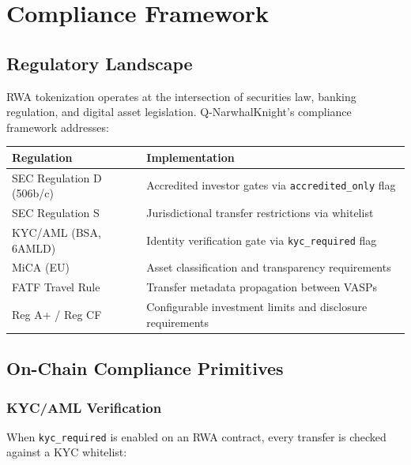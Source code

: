 \documentclass[11pt,a4paper,twoside]{article}
\begin{document}
\section{Compliance Framework}
\label{sec:compliance}

\subsection{Regulatory Landscape}

RWA tokenization operates at the intersection of securities law, banking regulation, and digital asset legislation. Q-NarwhalKnight's compliance framework addresses:

\begin{compliancebox}
\begin{tabularx}{\textwidth}{lX}
\textbf{Regulation} & \textbf{Implementation} \\
\midrule
SEC Regulation D (506b/c) & Accredited investor gates via \texttt{accredited\_only} flag \\
SEC Regulation S & Jurisdictional transfer restrictions via whitelist \\
KYC/AML (BSA, 6AMLD) & Identity verification gate via \texttt{kyc\_required} flag \\
MiCA (EU) & Asset classification and transparency requirements \\
FATF Travel Rule & Transfer metadata propagation between VASPs \\
Reg A+ / Reg CF & Configurable investment limits and disclosure requirements \\
\end{tabularx}
\end{compliancebox}

\subsection{On-Chain Compliance Primitives}

\subsubsection{KYC/AML Verification}

When \texttt{kyc\_required} is enabled on an RWA contract, every transfer is checked against a KYC whitelist:
\end{document}
